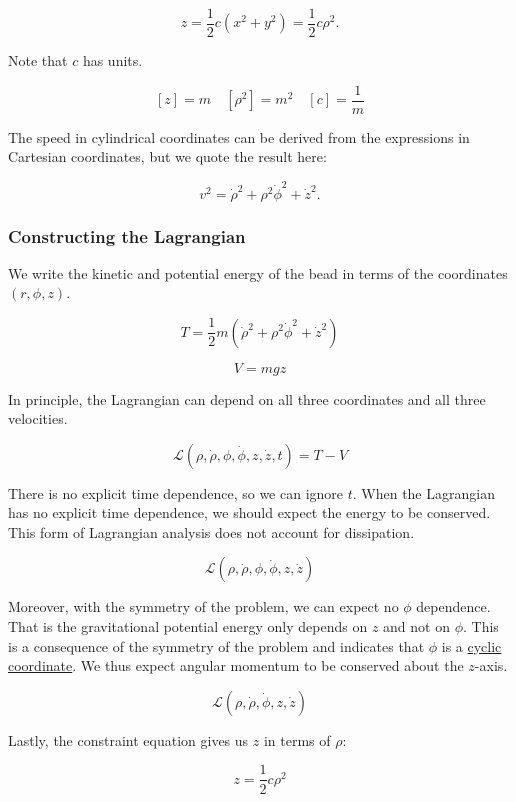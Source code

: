 \documentclass[11pt]{article}
\begin{document}
\[z = \dfrac{1}{2}c(x^2 + y^2) = \dfrac{1}{2}c\rho^2.\]

Note that \(c\) has units.

\[[z] = m \quad [\rho^2] = m^2 \quad [c] = \dfrac{1}{m}\]

The speed in cylindrical coordinates can be derived from the expressions
in Cartesian coordinates, but we quote the result here:

\[v^2 = \dot{\rho}^2 + \rho^2\dot{\phi}^2 + \dot{z}^2.\]

\subsubsection{Constructing the
Lagrangian}\label{constructing-the-lagrangian}

We write the kinetic and potential energy of the bead in terms of the
coordinates \((r, \phi, z)\).

\[T = \dfrac{1}{2}m\left(\dot{\rho}^2 + \rho^2\dot{\phi}^2 + \dot{z}^2\right)\]

\[V = mgz\]

In principle, the Lagrangian can depend on all three coordinates and all
three velocities.

\[\mathcal{L}(\rho, \dot{\rho}, \phi, \dot{\phi}, z, \dot{z}, t) = T - V\]

There is no explicit time dependence, so we can ignore \(t\). When the
Lagrangian has no explicit time dependence, we should expect the energy
to be conserved. This form of Lagrangian analysis does not account for
dissipation.

\[\mathcal{L}(\rho, \dot{\rho}, \phi, \dot{\phi}, z, \dot{z})\]

Moreover, with the symmetry of the problem, we can expect no \(\phi\)
dependence. That is the gravitational potential energy only depends on
\(z\) and not on \(\phi\). This is a consequence of the symmetry of the
problem and indicates that \(\phi\) is a
\href{https://phys.libretexts.org/Bookshelves/Classical_Mechanics/Variational_Principles_in_Classical_Mechanics_(Cline)/07\%3A_Symmetries_Invariance_and_the_Hamiltonian/7.05\%3A_Cyclic_Coordinates}{cyclic
coordinate}. We thus expect angular momentum to be conserved about the
\(z\)-axis.

\[\mathcal{L}(\rho, \dot{\rho}, \dot{\phi}, z, \dot{z})\]

Lastly, the constraint equation gives us \(z\) in terms of \(\rho\):

\[z = \dfrac{1}{2}c\rho^2\]
\end{document}
